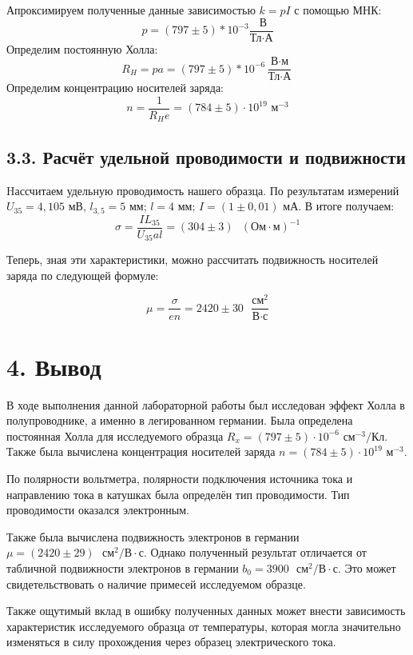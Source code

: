 \documentclass[a4paper,12pt]{article}
\begin{document}
Апроксимируем полученные данные зависимостью $k = pI$ с помощью МНК:
$$
    p = (797\pm 5)*10^{-3} \dfrac{\text{ В}}{\text{Тл}\cdot\text{А}}
$$
Определим постоянную Холла:
$$
R_H = pa = (797\pm 5)*10^{-6} \dfrac{\text{В}\cdot\text{м}}{\text{Тл}\cdot\text{А}}
$$
Определим концентрацию носителей заряда:
$$
n = \dfrac{1}{R_He} = (784\pm5)\cdot 10^{19} \text{ м}^{-3}
$$

\newpage

\subsection*{3.3. Расчёт удельной проводимости и подвижности}
Hассчитаем удельную проводимость нашего образца. По результатам измерений \\
$ U_{35} = 4,105 $ мВ, $l_{3,5} = 5$ мм; $l = 4$ мм; $I = (1\pm0,01)$ мА. В итоге получаем:
$$
\sigma = \frac{IL_{35}}{U_{35}al} = (304 \pm 3) \text{ } (\text{Ом}\cdot\text{м})^{-1}
$$

Теперь, зная эти характеристики, можно рассчитать подвижность носителей заряда по следующей формуле:

$$
\mu=\frac{\sigma}{en} = 2420 \pm 30 \text{ } \frac{\text{см}^2}{\text{В}\cdot\text{с}}
$$

\section*{4. Вывод}

В ходе выполнения данной лабораторной работы был исследован эффект Холла в полупроводнике, а именно в легированном германии. Была определена постоянная Холла для исследуемого образца $ R_x = (797\pm5) \cdot 10^{-6} \text{ см}^{-3}/\text{Кл} $. Также была вычислена концентрация носителей заряда $ n = (784\pm5) \cdot 10^{19} \text{ м}^{-3}. $

По полярности вольтметра, полярности подключения источника тока и направлению тока в катушках была определён тип проводимости. Тип проводимости оказался электронным.

Также была вычислена подвижность электронов в германии $ \mu = (2420\pm29) \text{ } \text{см}^2/\text{В}\cdot\text{с} $. Однако полученный результат отличается от табличной подвижности электронов в германии $ b_0 = 3900 \text{ } \text{см}^2/\text{В}\cdot\text{с} $. Это может свидетельствовать о наличие примесей исследуемом образце.

Также ощутимый вклад в ошибку полученных данных может внести зависимость характеристик исследуемого образца от температуры, которая могла значительно изменяться в силу прохождения через образец электрического тока.
\end{document}
